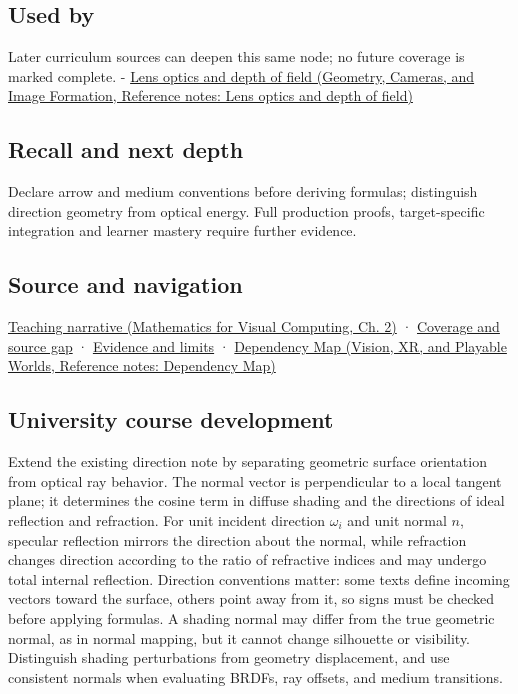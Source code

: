 \subsection{Used by}\label{appendix-44e00863b4d5-used-by}

Later curriculum sources can deepen this same node; no future coverage is marked complete. - \href{../03-Geometry-Cameras-and-Image-Formation/main.pdf\#nameddest=appendix-21f8456e2629}{Lens optics and depth of field (Geometry, Cameras, and Image Formation, Reference notes: Lens optics and depth of field)}

\subsection{Recall and next depth}\label{appendix-44e00863b4d5-recall-and-next-depth}

Declare arrow and medium conventions before deriving formulas; distinguish direction geometry from optical energy. Full production proofs, target-specific integration and learner mastery require further evidence.

\subsection{Source and navigation}\label{appendix-44e00863b4d5-source-and-navigation}

\href{../02-Mathematics-for-Visual-Computing/main.pdf\#nameddest=01-foundations-i-ch018-light-uses-the-same-decomposition-in-a-new-role}{Teaching narrative (Mathematics for Visual Computing, Ch. 2)} · \hyperref[appendix-fd090d982a15-phase-6---parts-501-600]{Coverage and source gap} · \hyperref[appendix-a103e7846d21-phase-6---source-analysis-and-verification]{Evidence and limits} · \href{../07-Vision-XR-and-Playable-Worlds/main.pdf\#nameddest=appendix-4ad47bdd269a}{Dependency Map (Vision, XR, and Playable Worlds, Reference notes: Dependency Map)}

\subsection{University course development}\label{appendix-44e00863b4d5-university-course-development}

Extend the existing direction note by separating geometric surface orientation from optical ray behavior. The normal vector is perpendicular to a local tangent plane; it determines the cosine term in diffuse shading and the directions of ideal reflection and refraction. For unit incident direction \(\omega_i\) and unit normal \(n\), specular reflection mirrors the direction about the normal, while refraction changes direction according to the ratio of refractive indices and may undergo total internal reflection. Direction conventions matter: some texts define incoming vectors toward the surface, others point away from it, so signs must be checked before applying formulas. A shading normal may differ from the true geometric normal, as in normal mapping, but it cannot change silhouette or visibility. Distinguish shading perturbations from geometry displacement, and use consistent normals when evaluating BRDFs, ray offsets, and medium transitions.

